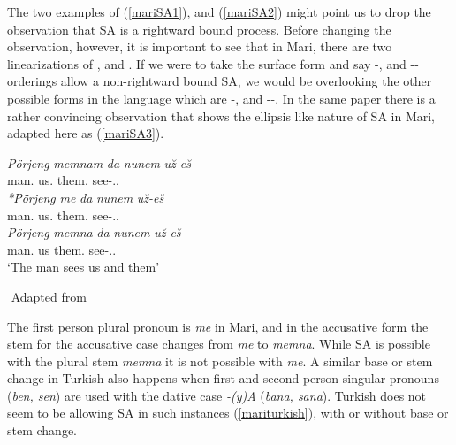 The two examples of (\ref{mariSA1}), and (\ref{mariSA2}) might point us to drop the observation that SA is a rightward bound process. Before changing the observation, however, it is important to see that in Mari, there are two linearizations of {\Poss}, {\Pl} and {\Lcase}. If we were to take the surface form and say {\Lcase}-{\Poss}, and {\Pl}-{\Lcase}-{\Poss} orderings allow a non-rightward bound SA, we would be overlooking the other possible forms in the language which are {\Poss}-{\Lcase}, and {\Poss}-{\Pl}-{\Lcase}. In the same paper there is a rather convincing observation that shows the ellipsis like nature of SA in Mari, adapted here as (\ref{mariSA3}).

\begin{exe}
 \ex \label{mariSA3}
    \begin{xlist}
        \ex \label{mariSA3a}
        \gll 
        \textit{Pörjeng} \textit{memnam} \textit{da} \textit{nunem} \textit{u\u{z}-e\u{s}} \\ man.{\Nom} us.{\Acc} {\And} them.{\Acc} see-{\Third}.{\Sg}.{\Prs} \\
        
        \ex \label{mariSA3c}
        \gll 
        \textit{*Pörjeng} \textit{me} \textit{da} \textit{nunem} \textit{u\u{z}-e\u{s}} \\ man.{\Nom} us.{\Acc} {\And} them.{\Acc} see-{\Third}.{\Sg}.{\Prs} \\
        
        \ex \label{mariSA3b} 
        \gll
        \textit{Pörjeng} \textit{memna} \textit{da} \textit{nunem} \textit{u\u{z}-e\u{s}} \\ man.{\Nom} us {\And} them.{\Acc} see-{\Third}.{\Sg}.{\Prs} \\
        \glt `The man sees us and them'
    \end{xlist}
    ${}$ \hfill Adapted from \cite{guseva2017postsyntactic}
\end{exe}

The first person plural pronoun is \textit{me} in Mari, and in the accusative form the stem for the accusative case changes from \textit{me} to \textit{memna}. While SA is possible with the plural stem \textit{memna} it is not possible with \textit{me}. A similar base or stem change in Turkish also happens when first and second person singular pronouns (\textit{ben, sen}) are used with the dative case \textit{-(y)A} (\textit{bana, sana}). Turkish does not seem to be allowing SA in such instances (\ref{mariturkish}), with or without base or stem change.

